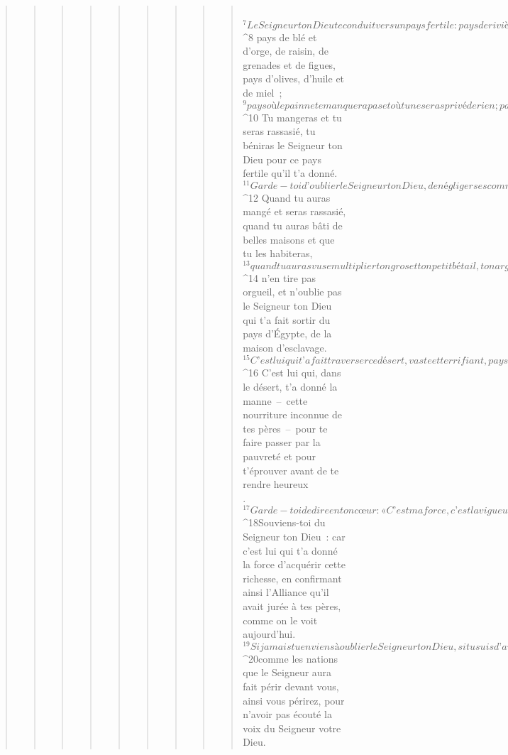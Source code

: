 \begin{verse}
\begin{verse}
\begin{verse}
\begin{verse}
\begin{verse}
\begin{verse}
\begin{verse}
\begin{verse}
\begin{verse}
         
${}^{7}Le Seigneur ton Dieu te conduit vers un pays fertile : pays de rivières abondantes, de sources profondes jaillissant dans les vallées et les montagnes, 
${}^{8} pays de blé et d’orge, de raisin, de grenades et de figues, pays d’olives, d’huile et de miel ; 
${}^{9} pays où le pain ne te manquera pas et où tu ne seras privé de rien ; pays dont les pierres contiennent du fer, et dont les montagnes sont des mines de cuivre. 
${}^{10} Tu mangeras et tu seras rassasié, tu béniras le Seigneur ton Dieu pour ce pays fertile qu’il t’a donné. 
${}^{11} Garde-toi d’oublier le Seigneur ton Dieu, de négliger ses commandements, ses ordonnances et ses décrets, que je te donne aujourd’hui. 
${}^{12} Quand tu auras mangé et seras rassasié, quand tu auras bâti de belles maisons et que tu les habiteras, 
${}^{13} quand tu auras vu se multiplier ton gros et ton petit bétail, ton argent, ton or et tous tes biens, 
${}^{14} n’en tire pas orgueil, et n’oublie pas le Seigneur ton Dieu qui t’a fait sortir du pays d’Égypte, de la maison d’esclavage. 
${}^{15} C’est lui qui t’a fait traverser ce désert, vaste et terrifiant, pays des serpents brûlants et des scorpions, pays de la sécheresse et de la soif. C’est lui qui, pour toi, a fait jaillir l’eau de la roche la plus dure. 
${}^{16} C’est lui qui, dans le désert, t’a donné la manne – cette nourriture inconnue de tes pères – pour te faire passer par la pauvreté et pour t’éprouver avant de te rendre heureux\\.
${}^{17}Garde-toi de dire en ton cœur : « C’est ma force, c’est la vigueur de ma main qui m’ont procuré cette richesse. » 
${}^{18}Souviens-toi du Seigneur ton Dieu : car c’est lui qui t’a donné la force d’acquérir cette richesse, en confirmant ainsi l’Alliance qu’il avait jurée à tes pères, comme on le voit\\aujourd’hui. 
${}^{19}Si jamais tu en viens à oublier le Seigneur ton Dieu, si tu suis d’autres dieux, si tu les sers et si tu te prosternes devant eux – je l’atteste aujourd’hui contre vous –, à coup sûr vous périrez : 
${}^{20}comme les nations que le Seigneur aura fait périr devant vous, ainsi vous périrez, pour n’avoir pas écouté la voix du Seigneur votre Dieu.
      

\end{verse}
\end{verse}
\end{verse}
\end{verse}
\end{verse}
\end{verse}
\end{verse}
\end{verse}
\end{verse}

